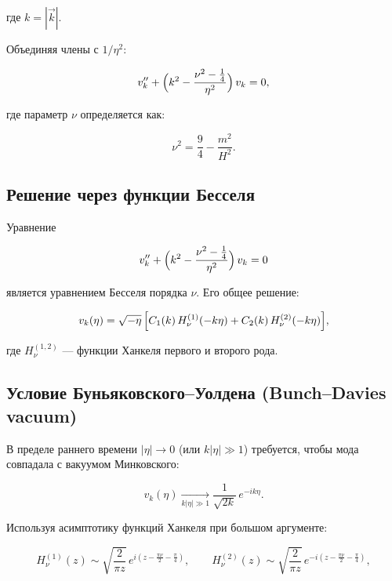 \documentclass[12pt,a4paper]{article}
\begin{document}
где $k = |\vec{k}|$.

Объединяя члены с $1/\eta^2$:

\begin{equation}
v_k'' + \Bigl(k^2 - \frac{\nu^2 - \tfrac{1}{4}}{\eta^2}\Bigr)\,v_k = 0,
\end{equation}

где параметр $\nu$ определяется как:

\begin{equation}
\nu^2 = \frac{9}{4} - \frac{m^2}{H^2}.
\end{equation}

\subsection{Решение через функции Бесселя}

Уравнение

\begin{equation}
v_k'' + \Bigl(k^2 - \frac{\nu^2 - \tfrac{1}{4}}{\eta^2}\Bigr)\,v_k = 0
\end{equation}

является уравнением Бесселя порядка $\nu$. Его общее решение:

\begin{equation}
v_k(\eta) = \sqrt{-\eta}\,\Bigl[C_1(k)\,H_\nu^{(1)}(-k\eta) + C_2(k)\,H_\nu^{(2)}(-k\eta)\Bigr],
\end{equation}

где $H_\nu^{(1,2)}$ — функции Ханкеля первого и второго рода.

\subsection{Условие Буньяковского--Уолдена (Bunch--Davies vacuum)}

В пределе раннего времени $|\eta| \to 0$ (или $k|\eta| \gg 1$) требуется, чтобы
мода совпадала с вакуумом Минковского:

\begin{equation}
v_k(\eta) \xrightarrow[k|\eta|\gg 1]{} \frac{1}{\sqrt{2k}}\,e^{-ik\eta}.
\end{equation}

Используя асимптотику функций Ханкеля при большом аргументе:

\begin{equation}
H_\nu^{(1)}(z) \sim \sqrt{\frac{2}{\pi z}}\,e^{i(z - \frac{\pi\nu}{2} - \frac{\pi}{4})}, \qquad
H_\nu^{(2)}(z) \sim \sqrt{\frac{2}{\pi z}}\,e^{-i(z - \frac{\pi\nu}{2} - \frac{\pi}{4})},
\end{equation}
\end{document}

